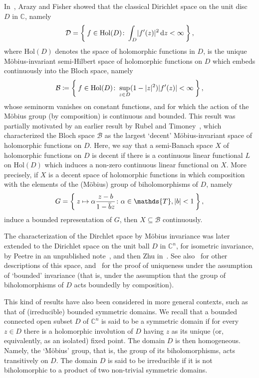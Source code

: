 \documentclass[10.5pt,reqno]{amsart}
\newcommand{\Hol}{\mathrm{Hol}}
\newcommand{\dd}{\mathrm{d}}
\DeclarePairedDelimiter{\abs}{\lvert}{\rvert}
\newcommand{\C}{\mathds{C}}
\newcommand{\T}{\mathds{T}}
\newcommand{\Bc}{\mathcal{B}}
\newcommand{\Dc}{\mathcal{D}}
\begin{document}
In~\cite{ArazyFisher}, Arazy and Fisher showed that the classical Dirichlet space on the unit disc $D$ in $\C$, namely
\[
\Dc=\Set{f\in \Hol(D)\colon \int_{D} \abs{f'(z)}^2\,\dd z<\infty},
\]
where $\Hol(D)$ denotes the space of holomorphic functions in $D$,
is the unique M\"obius-invariant semi-Hilbert space of holomorphic functions on $D$ which embeds continuously into the Bloch space, namely
\[
\Bc\coloneqq \Set{f\in \Hol(D)\colon \sup_{z\in D}(1-\abs{z}^2) \abs{f'(z)}<\infty },
\]
whose seminorm vanishes on constant functions, and for which the action of the M\"obius group (by composition) is continuous and bounded. 
This result was partially motivated by an earlier result by Rubel and Timoney~\cite{RubelTimoney}, which characterized the Bloch space  $\Bc$ as the largest `decent' M\"obius-invariant space of holomorphic functions on $D$. Here, we say that a semi-Banach  space $X$ of holomorphic functions on $D$ is decent if there is a  continuous linear functional $L$ on $\Hol(D)$ which induces a non-zero continuous linear functional on $X$. More precisely,  if $X$ is a decent space of holomorphic functions in which  composition with the elements of the (M\"obius) group of biholomorphisms of $D$, namely
\[
G=\Set{ z\mapsto \alpha\frac{z-b}{1-\overline b z}\colon \alpha\in \T, \abs{b}<1 },
\]
induce a bounded representation of $G$, then $X\subseteq \Bc$ continuously. 

The characterization of the Dirchlet space by M\"obius invariance was later extended to the Dirichlet space on the unit ball $D$ in $\C^n$, for isometric invariance, by Peetre in an unpublished note~\cite{Peetre}, and then Zhu in~\cite{Zhu}. See also~\cite{Peloso,Arazy3} for other descriptions of this space, and~\cite[Theorem 5]{ArazyFisher2} for the proof of uniqueness under the assumption of `bounded' invariance (that is, under the assumption that the group of biholomorphisms of $D$ acts boundedly by composition). 

This kind of results have also been considered in more general contexts, such as that of (irreducible) bounded symmetric domains. We recall that  a bounded connected open subset $D$ of $\C^n$ is said to be a symmetric domain if for every $z\in D$ there is a holomorphic involution of $D$ having $z$ as its unique (or, equivalently, as an isolated) fixed point. The domain $D$ is then homogeneous. Namely, the `M\"obius' group, that is, the group of its biholomorphisms, acts transitively on $D$. 
The domain $D$ is said to be irreducible if it is not biholomorphic to a product of two non-trivial symmetric domains. 
\end{document}
